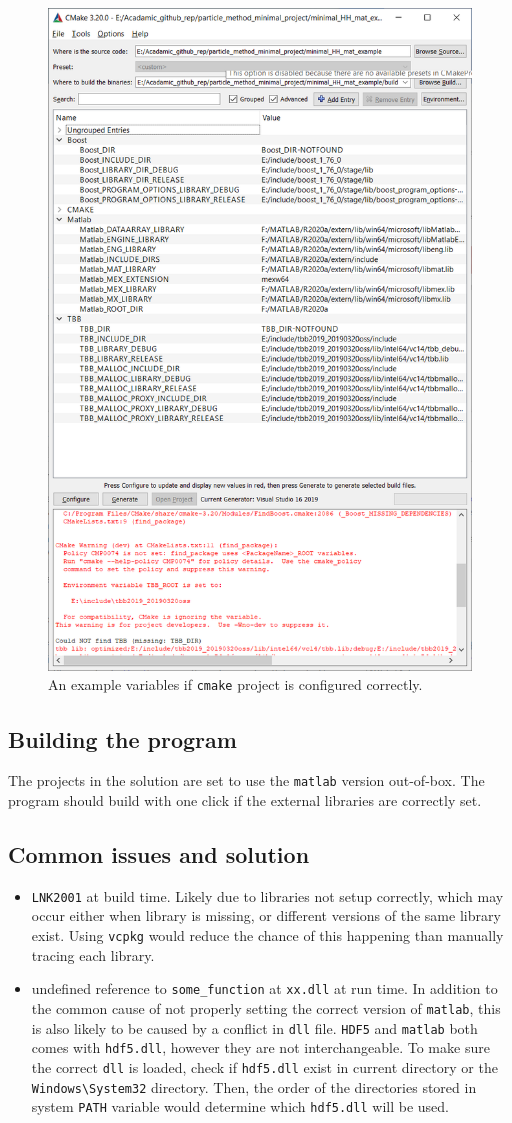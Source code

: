 \documentclass[10pt]{article} %
\begin{document}
\begin{figure}[H]
\includegraphics[width=0.7 \textwidth]{cmake_step2}
\caption{An example variables if \texttt{cmake} project is configured correctly.}
\end{figure}
\subsection{Building the program}

The projects in the solution are set to use the \texttt{matlab} version out-of-box. The program should build with one click if the external libraries are correctly set.

\subsection{Common issues and solution}
\begin{itemize}
\item
\texttt{LNK2001} at build time. Likely due to libraries not setup correctly, which may occur either when library is missing, or different versions of the same library exist. Using \texttt{vcpkg} would reduce the chance of this happening than manually tracing each library.
\item
undefined reference to \texttt{some\_function} at \texttt{xx.dll} at run time. In addition to the common cause of not properly setting the correct version of \texttt{matlab}, this is also likely to be caused by a conflict in \texttt{dll} file. \texttt{HDF5} and \texttt{matlab} both comes with \texttt{hdf5.dll}, however they are not interchangeable. To make sure the correct \texttt{dll} is loaded, check if \texttt{hdf5.dll} exist in current directory or the \texttt{Windows\textbackslash System32} directory. Then, the order of the directories stored in system \texttt{PATH} variable would determine which \texttt{hdf5.dll} will be used.
\end{itemize}
\end{document}
